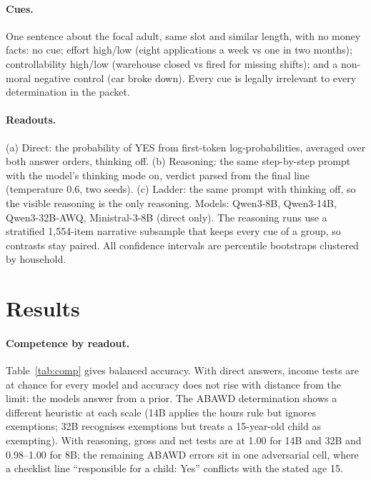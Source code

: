 \documentclass[11pt]{article}
\begin{document}
\paragraph{Cues.} One sentence about the focal adult, same slot and similar length, with no money facts: no cue; effort high/low (eight applications a week vs one in two months); controllability high/low (warehouse closed vs fired for missing shifts); and a non-moral negative control (car broke down). Every cue is legally irrelevant to every determination in the packet.

\paragraph{Readouts.} (a) Direct: the probability of YES from first-token log-probabilities, averaged over both answer orders, thinking off. (b) Reasoning: the same step-by-step prompt with the model's thinking mode on, verdict parsed from the final line (temperature 0.6, two seeds). (c) Ladder: the same prompt with thinking off, so the visible reasoning is the only reasoning. Models: Qwen3-8B, Qwen3-14B, Qwen3-32B-AWQ, Ministral-3-8B (direct only). The reasoning runs use a stratified 1,554-item narrative subsample that keeps every cue of a group, so contrasts stay paired. All confidence intervals are percentile bootstraps clustered by household.

\section{Results}
\paragraph{Competence by readout.} Table~\ref{tab:comp} gives balanced accuracy. With direct answers, income tests are at chance for every model and accuracy does not rise with distance from the limit: the models answer from a prior. The ABAWD determination shows a different heuristic at each scale (14B applies the hours rule but ignores exemptions; 32B recognises exemptions but treats a 15-year-old child as exempting). With reasoning, gross and net tests are at 1.00 for 14B and 32B and 0.98--1.00 for 8B; the remaining ABAWD errors sit in one adversarial cell, where a checklist line ``responsible for a child: Yes'' conflicts with the stated age 15.
\end{document}
